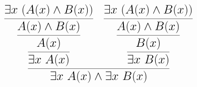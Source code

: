 \documentclass[14pt,border=2pt]{standalone}
\begin{document}
        $$
        \LARGE 

\begin{prooftree}
\hypo{\exists x~ (A(x) \land B(x))} 
\infer1{A(x) \land B(x)}
\infer1{A(x)} 
\infer1{\exists x~ A(x)} 
\hypo{\exists x~ (A(x) \land B(x))} 
\infer1{A(x) \land B(x)}
\infer1{B(x)}
\infer1{\exists x~ B(x)}
\infer2{\exists x~ A(x) \land \exists x~ B(x)}
\end{prooftree}
        $$
        
\end{document}
